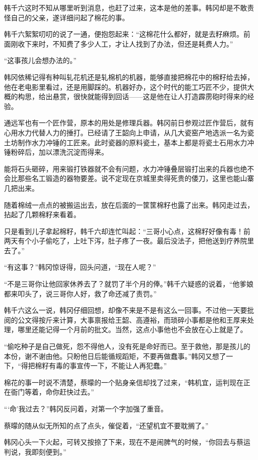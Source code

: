韩千六这时不知从哪里听到消息，也赶了过来，这本是他的差事。韩冈却是不敢责怪自己的父亲，遂详细问起了棉花的事。

韩千六絮絮叨叨的说了一通，便抱怨起来：“这棉花什么都好，就是去籽麻烦。前面刚收下来时，不知费了多少人工，才让人找到了办法，但还是耗费人力。”

“这事孩儿会想办法的。”

韩冈依稀记得有种叫轧花机还是轧棉机的机器，能够直接把棉花中的棉籽给去掉，他在老电影里看过，还是用脚踩的。机器好办，这个时代的能工巧匠不少，提供大概的构思，给出悬赏，很快就能得到回话——这是他在让人打造霹雳砲时得来的经验。

通远军也有一个匠作营，原本的用处是修理兵器。韩冈前日参观过匠作营后，就有心用水力代替人力的捶打。已经请了王韶向上申请，从几大瓷窑产地选派一名为瓷土坊制作水力冲锤的工匠来。此时瓷器的原料瓷土，基本上都是将瓷土石用水力冲锤粉碎后，加以漂洗沉淀而得来。

能将石头砸碎，用来锻打铁器就不会有问题，水力冲锤叠层锻打出来的兵器也绝不会比那些名工锻造的器物要差。说不定现在京城里卖得死贵的倭刀，这里也能山寨几把出来。

随着棉绒一点点的被搬运出去，放在后面的一筐筐棉籽也露了出来。韩冈走过去，拈起了几颗棉籽来看着。

只是看到儿子拿起棉籽，韩千六却连忙叫起：“三哥小心点，这棉籽好像有毒！前两天有个小子偷吃了，上吐下泻，肚子疼了一夜。最后没法子，把他送到疗养院里去了。”

“有这事？”韩冈惊讶得，回头问道，“现在人呢？”

“不是三哥你让他回家休养去了？就罚了半个月的俸。”韩千六疑惑的说着，“他爹娘都来叩头了，说三哥你人好，救了命还减了责罚。”

韩千六这么一说，韩冈仔细回想，却像不来是不是有这么一回事。不过他一天要批阅的公文得按斤来计算，大事禀报给王韶、高遵裕，而琐碎小事都是他和王厚来处理，哪里还能记得一个月前的批文。当然，这点小事他也不会放在心上就是了。

“偷吃种子是自己做死，怨不得他人，没有死是命好而已。至于救他，那是孩儿的本份，谢不谢由他。只盼他日后能循规蹈矩，不要再做蠢事。”韩冈又想了一下，“得把棉籽有毒的事宣传一下，不能让人再犯蠢。”

棉花的事一时说不清楚，蔡曚的一个贴身亲信却找了过来，“韩机宜，运判现在正在衙门等着，命你赶快过去。”

“‘命’我过去？”韩冈反问着，对第一个字加强了重音。

蔡曚的随从似无所知的点了点头，催促着，“还望机宜不要耽搁了。”

韩冈心头一下火起，可转又按捺了下来，现在不是闹脾气的时候，“你回去与蔡运判说，我即刻便到。”

